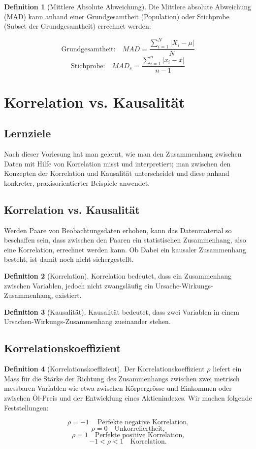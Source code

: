 \documentclass{article}
\theoremstyle{definition}
\newtheorem{definition}{Definition}
\theoremstyle{exercise}
\theoremstyle{solution}
\theoremstyle{lemma}
\begin{document}
\begin{definition}[Mittlere Absolute Abweichung]
Die Mittlere absolute Abweichung (MAD) kann anhand einer Grundgesamtheit (Population) oder Stichprobe (Subset der Grundgesamtheit) errechnet werden:

\[ \text{Grundgesamtheit:} \quad MAD=\frac{\sum_{i=1}^{N}|X_i-\mu|}{N} \]
\[ \text{Stichprobe:} \quad MAD_s=\frac{\sum_{i=1}^{n}|x_i-\overline{x}|}{n-1} \]

\end{definition}


\section{Korrelation vs. Kausalität}
\subsection{Lernziele}
Nach dieser Vorlesung hat man gelernt, wie man den Zusammenhang zwischen Daten mit Hilfe von Korrelation misst und interpretiert; man zwischen den Konzepten der Korrelation und Kausalität unterscheidet und diese anhand konkreter, praxisorientierter Beispiele anwendet.

\subsection{Korrelation vs. Kausalität}
Werden Paare von Beobachtungsdaten erhoben, kann das Datenmaterial so beschaffen sein, dass zwischen den Paaren ein statistischen Zusammenhang, also eine Korrelation, errechnet werden kann. Ob Dabei ein kausaler Zusammenhang besteht, ist damit noch nicht sichergestellt.

\begin{definition}[Korrelation]
Korrelation bedeutet, dass ein Zusammenhang zwischen Variablen, jedoch nicht zwangsläufig ein Ursache-Wirkungs-Zusammenhang, existiert.
\end{definition}

\begin{definition}[Kausalität]
Kausalität bedeutet, dass zwei Variablen in einem Ursachen-Wirkungs-Zusammenhang zueinander stehen.
\end{definition}

\subsection{Korrelationskoeffizient}
\begin{definition}[Korrelationskoeffizient]
Der Korrelationskoeffizient \(\rho\) liefert ein Mass für die Stärke der Richtung des Zusammenhangs zwischen zwei metrisch messbaren Variablen wie etwa zwischen Körpergrösse und Einkommen oder zwischen Öl-Preis und der Entwicklung eines Aktienindexes. Wir machen folgende Feststellungen:

\[ \rho = -1 \quad\ \text{Perfekte negative Korrelation,}\]
\[ \rho = 0 \quad \text{Unkorreliertheit,}\]
\[ \rho = 1 \quad \text{Perfekte positive Korrelation,}\]
\[ -1 < \rho < 1 \quad \text{Korrelation.}\]
\end{definition}
\end{document}

